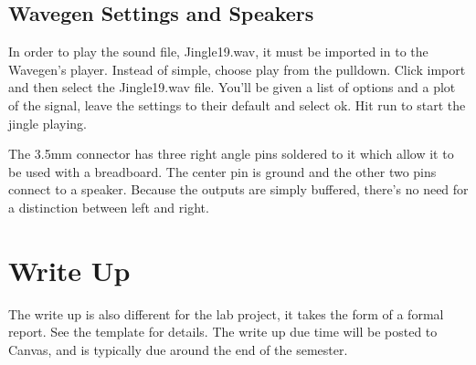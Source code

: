 \subsection{Wavegen Settings and Speakers}

In order to play the sound file, Jingle19.wav, it must be imported in to the Wavegen's player. Instead of simple, choose play from the pulldown. Click import and then select the Jingle19.wav file. You'll be given a list of options and a plot of the signal, leave the settings to their default and select ok. Hit run to start the jingle playing. 

The 3.5mm connector has three right angle pins soldered to it which allow it to be used with a breadboard. The center pin is ground and the other two pins connect to a speaker. Because the outputs are simply buffered, there's no need for a distinction between left and right. 


%
%

\section{Write Up}

The write up is also different for the lab project, it takes the form of a formal report. See the template for details. The write up due time will be posted to Canvas, and is typically due around the end of the semester. 









